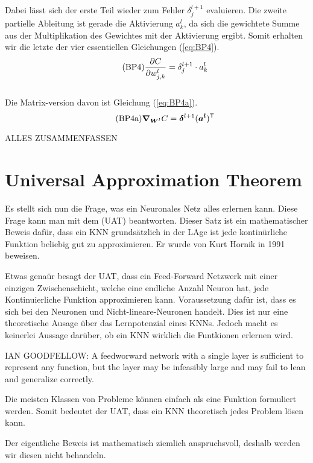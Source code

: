\\
Dabei lässt sich der erste Teil wieder zum Fehler $\delta_j^{l+1}$ evaluieren.
Die zweite partielle Ableitung ist gerade die Aktivierung $a_k^l$, da sich die
gewichtete Summe aus der Multiplikation des Gewichtes mit der Aktivierung ergibt.
Somit erhalten wir die letzte der vier essentiellen Gleichungen (\ref{eq:BP4}).
\begin{equation}\tag{BP4}\label{eq:BP4}
  \frac{\partial C}{\partial w_{j,k}^l} = \delta_j^{l+1} \cdot a_k^l
\end{equation}
\\
Die Matrix-version davon ist Gleichung (\ref{eq:BP4a}).
\begin{equation}\tag{BP4a}\label{eq:BP4a}
  \bm{\nabla}_{\bm{W}^l} C = \bm{\delta}^{l+1} (\bm{a^l})^{\mathsf{T}}
\end{equation}

ALLES ZUSAMMENFASSEN

\cite{Nielsen}


\section{Universal Approximation Theorem}\label{sec:UAT}
Es stellt sich nun die Frage, was ein Neuronales Netz alles erlernen kann.
Diese Frage kann man mit dem  (UAT)
beantworten. Dieser Satz ist ein mathematischer Beweis dafür, dass ein KNN
grundsätzlich in der LAge ist jede kontinürliche Funktion beliebig gut zu
approximieren. Er wurde von Kurt Hornik in 1991 beweisen.

Etwas genaür besagt der UAT, dass ein Feed-Forward Netzwerk mit einer einzigen
Zwischenschicht, welche eine endliche Anzahl Neuron hat, jede Kontinuierliche
Funktion approximieren kann. Voraussetzung dafür ist, dass es sich bei den
Neuronen und Nicht-lineare-Neuronen handelt. Dies ist nur eine theoretische
Ausage über das Lernpotenzial eines KNNs. Jedoch macht es keinerlei Aussage
darüber, ob ein KNN wirklich die Funtkionen erlernen wird.

IAN GOODFELLOW:
A feedworward network with a single layer is sufficient to represent any
function, but the layer may be infeasibly large and may fail to lean and
generalize correctly.

Die meisten Klassen von Probleme können einfach als eine Funktion formuliert
werden. Somit bedeutet der UAT, dass ein KNN theoretisch jedes Problem lösen kann.

Der eigentliche Beweis ist mathematisch ziemlich anspruchsvoll, deshalb werden
wir diesen nicht behandeln.


